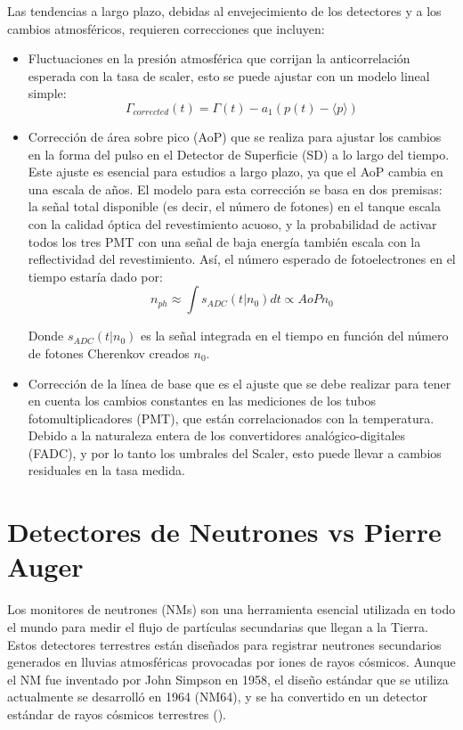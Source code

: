 Las tendencias a largo plazo, debidas al envejecimiento de los detectores y a los cambios atmosféricos, requieren correcciones que incluyen: 
\begin{itemize}
    \item Fluctuaciones en la presión atmosférica que corrijan la anticorrelación esperada con la tasa de scaler, esto se puede ajustar con un modelo lineal simple:
\begin{equation}
    \Gamma_{corrected}(t)=\Gamma(t)-a_{1}(p(t)-\langle p\rangle)
\end{equation}
    \item Corrección de área sobre pico (AoP) que se realiza para ajustar los cambios en la forma del pulso en el Detector de Superficie (SD) a lo largo del tiempo. Este ajuste es esencial para estudios a largo plazo, ya que el AoP cambia en una escala de años. El modelo para esta corrección se basa en dos premisas: la señal total disponible (es decir, el número de fotones) en el tanque escala con la calidad óptica del revestimiento acuoso, y la probabilidad de activar todos los tres PMT con una señal de baja energía también escala con la reflectividad del revestimiento. Así, el número esperado de fotoelectrones en el tiempo estaría dado por:
\begin{equation}
    n_{ph}\approx \int s_{ADC}(t|n_{0})  dt  \propto AoP n_{0}
\end{equation}

Donde $s_{ADC}(t|n_{0})$ es la señal integrada en el tiempo en función del número de fotones Cherenkov creados $n_{0}$. 

    \item  Corrección de la línea de base que es el ajuste que se debe realizar para tener en cuenta los cambios constantes en las mediciones de los tubos fotomultiplicadores (PMT), que están correlacionados con la temperatura. Debido a la naturaleza entera de los convertidores analógico-digitales (FADC), y por lo tanto los umbrales del Scaler, esto puede llevar a cambios residuales en la tasa medida.
\end{itemize} 

\section{Detectores de Neutrones vs Pierre Auger}

Los monitores de neutrones (NMs) son una herramienta esencial utilizada en todo el mundo para medir el flujo de partículas secundarias que llegan a la Tierra. Estos detectores terrestres están diseñados para registrar neutrones secundarios generados en lluvias atmosféricas provocadas por iones de rayos cósmicos. Aunque el NM fue inventado por John Simpson en 1958, el diseño estándar que se utiliza actualmente se desarrolló en 1964 (NM64), y se ha convertido en un detector estándar de rayos cósmicos terrestres (\cite{eleana_2017}).

